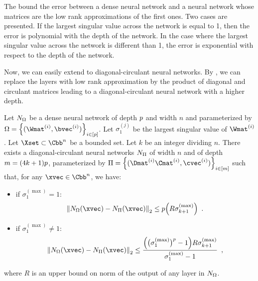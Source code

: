 \noindent
The  bound the error between a dense neural network and a neural network whose matrices are the low rank approximations of the first ones.
Two cases are presented. If the largest singular value across the network is equal to 1, then the error is polynomial with the depth of the network.
In the case where the largest singular value across the network is different than 1, the error is exponential with respect to the depth of the network.

Now, we can easily extend  to diagonal-circulant neural networks. 
By , we can replace the layers with low rank approximation by the product of diagonal and circulant matrices leading to a diagonal-circulant neural network with a higher depth.



\begin{maincorollary} \label{corollary:relu_to_circ}
  Let $N_\Omega$ be a dense neural network of depth $p$ and width $n$ and parameterized by $\Omega = \left\{(\Wmat^{(i)},\bvec^{(i)} ) \right\}_{i \in [\depth]}$.
  Let $\sigma_1^{(j)}$ be the largest singular value of $\Wmat^{(i)}$.
  Let $\Xset \subset \Cn$ be a bounded set.
  Let $k$ be an integer dividing $n$.
  There  exists a diagonal-circulant neural networks $N_\Pi$ of width $n$ and of depth $m = (4k+1)p$, parameterized by $\Pi = \left\{(\Dmat^{(i)}\Cmat^{(i)},\cvec^{(i)})\right\}_{i \in [m]}$ such that, for any $\xvec \in \Cn$, we have:
  \begin{itemize}
    \item if $\sigma_{1}^{(\max)} = 1$:
      \begin{equation}
	\norm{ \nn_\Omega(\xvec) - \nn_{\Pi}(\xvec)}_2 \le \depth \left(  R \sigma_{k+1}^{(\max)} \right) \enspace.
      \end{equation}
    \item if $\sigma_{1}^{(\max)} \neq 1$:
      \begin{equation}
	\norm{ \nn_\Omega(\xvec) - \nn_{\Pi}(\xvec)}_2 \le \frac{\left( \big(\sigma_{1}^{(\max)}\big)^\depth - 1 \right) R \sigma_{k+1}^{(\max)}}{\sigma_{1}^{(\max)} - 1} \enspace,
      \end{equation}
  \end{itemize}
  where $R$ is an upper bound on norm of the output of any layer in $N_\Omega$.
\end{maincorollary}



